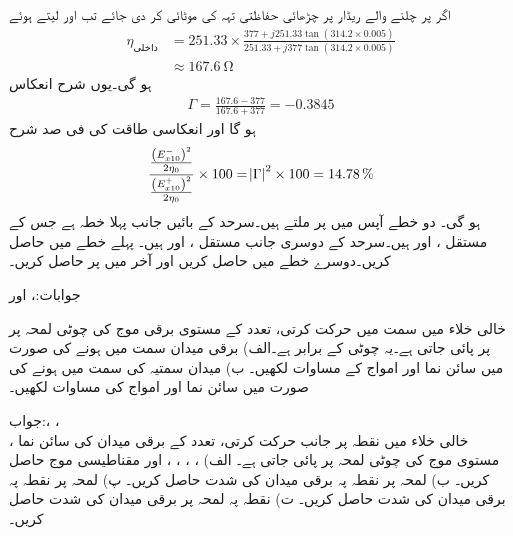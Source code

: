 اگر  پر چلنے والے ریڈار پر چڑھائی حفاظتی تہہ کی موٹائی  کر دی جائے تب  اور  لیتے ہوئے
\begin{align*}
\eta_{\text{داخلی}}&=251.33 \times \frac{377+j 251.33 \tan (314.2 \times 0.005)}{251.33+j 377 \tan(314.2\times 0.005)}\\
&\approx \SI{167.6}{\ohm}
\end{align*}
ہو گی۔یوں شرح انعکاس
\begin{align*}
\Gamma=\frac{167.6-377}{167.6+377}=-0.3845
\end{align*}
ہو گا اور انعکاسی طاقت کی فی صد شرح
\begin{align*}
\frac{\frac{\left(E_{x10}^-\right)^2}{2\eta_0}}{\frac{\left(E_{x10}^+\right)^2}{2\eta_0}} \times 100=\abs{\Gamma}^2 \times 100=\SI{14.78}{\%}
\end{align*}
ہو گی۔
دو خطے آپس میں  پر ملتے ہیں۔سرحد کے بائیں جانب پہلا خطہ ہے جس کے مستقل ،  اور  ہیں۔سرحد کے دوسری جانب مستقل ،  اور  ہیں۔ پہلے خطے میں  حاصل کریں۔دوسرے خطے میں  حاصل کریں اور آخر میں  پر  حاصل کریں۔

جوابات:،  اور 

\newpage
{}

خالی خلاء میں  سمت میں حرکت کرتی،  تعدد  کے مستوی برقی موج  کی  چوٹی لمحہ  پر   پر پائی جاتی ہے۔یہ چوٹی  کے برابر ہے۔الف) برقی میدان  سمت میں ہونے کی صورت میں سائن نما   اور  امواج کے مساوات لکھیں۔ ب) میدان سمتیہ  کی سمت میں ہونے کی صورت
 میں سائن نما   اور   امواج کی مساوات لکھیں۔

جواب:، ،\\ ،  
خالی خلاء میں  نقطہ  پر  جانب حرکت کرتی،  تعدد کے برقی میدان کی سائن نما مستوی موج کی چوٹی لمحہ  پر  پائی جاتی ہے۔ الف) ، ، ، ،  اور مقناطیسی موج  حاصل کریں۔  ب) لمحہ  پر نقطہ  پہ برقی میدان کی شدت  حاصل کریں۔ پ) لمحہ  پر نقطہ  پہ برقی میدان کی شدت  حاصل کریں۔ ت) نقطہ  پہ لمحہ  پر برقی میدان کی شدت حاصل کریں۔ 

